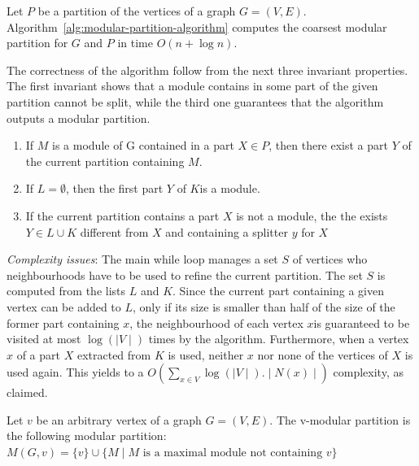 \begin{mytheo}
    Let $P$ be a partition of the vertices of a graph $G = (V, E)$.
    Algorithm~\ref{alg:modular-partition-algorithm} computes the coarsest modular partition for $G$ and $P$ in time $O(n + \log{n})$.
\end{mytheo}

The correctness of the algorithm follow from the next three invariant properties.
The first invariant shows that a module contains in some part of the given partition cannot be split, while the third one guarantees that the algorithm outputs a modular partition.

\begin{enumerate}
    \item If $M$ is a module of G contained in a part $X \in P$, then there exist a part $Y$ of the current partition containing $M$.
    \item If $L = \emptyset$, then the first part $Y$ of $K$is a module.
    \item If the current partition contains a part $X$ is not a module, the the exists $Y \in L \cup K$ different from $X$ and containing a splitter $y$ for $X$
\end{enumerate}

\textit{Complexity issues}: The main while loop manages a set $S$ of vertices who neighbourhoods have to be used to refine the current partition.
The set $S$ is computed from the lists $L$ and $K$.
Since the current part containing a given vertex can be added to $L$, only if its size is smaller than half of the size of the former part containing $x$, the neighbourhood of each vertex $x $is guaranteed to be visited at most $\log{(\mid V \mid)}$ times by the algorithm.
Furthermore, when a vertex $x$ of a part $X$ extracted from $K$ is used, neither $x$ nor none of the vertices of $X$ is used again.
This yields to a $O\left(\sum_{x \in V} \log{(\mid V \mid)}.\mid N (x) \mid\right)$ complexity, as claimed.



\begin{mydef}
    Let $v$ be an arbitrary vertex of a graph $G = (V, E)$.
    The v-modular partition is the following modular partition: \\
    $M(G, v) = \{v\} \cup \{M \mid M \text{ is a maximal module not containing } v\}$
\end{mydef}

